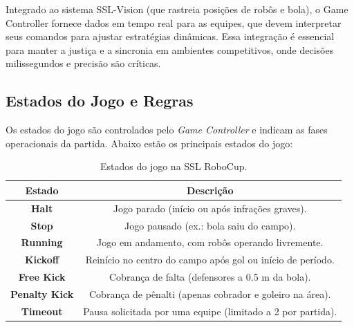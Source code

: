 Integrado ao sistema SSL-Vision (que rastreia posições de robôs e bola), o Game Controller fornece dados em tempo real para as equipes, que devem interpretar seus comandos para ajustar estratégias dinâmicas. Essa integração é essencial para manter a justiça e a sincronia em ambientes competitivos, onde decisões milissegundos e precisão são críticas.  







\subsection{Estados do Jogo e Regras}

Os estados do jogo são controlados pelo \textit{Game Controller} e indicam as fases operacionais da partida. Abaixo estão os principais estados do jogo:

\begin{table}[h!]
\centering
\begin{tabular}{c|c}
\hline
\textbf{Estado}      & \textbf{Descrição}                              \\ \hline
\textbf{Halt}         & Jogo parado (início ou após infrações graves).  \\ 
\textbf{Stop}         & Jogo pausado (ex.: bola saiu do campo).         \\ 
\textbf{Running}      & Jogo em andamento, com robôs operando livremente. \\ 
\textbf{Kickoff}      & Reinício no centro do campo após gol ou início de período. \\ 
\textbf{Free Kick}    & Cobrança de falta (defensores a 0.5 m da bola). \\ 
\textbf{Penalty Kick} & Cobrança de pênalti (apenas cobrador e goleiro na área). \\ 
\textbf{Timeout}      & Pausa solicitada por uma equipe (limitado a 2 por partida). \\ \hline
\end{tabular}
\caption{Estados do jogo na SSL RoboCup.}
\end{table}

